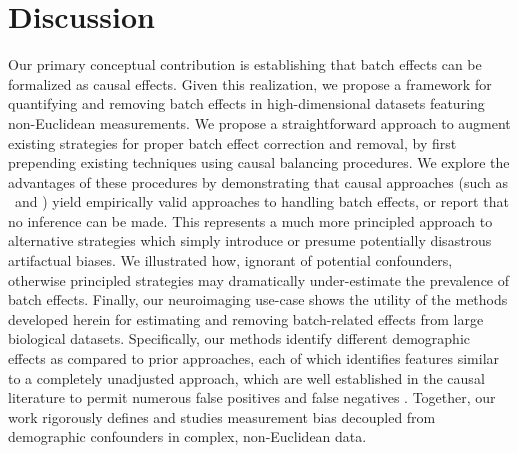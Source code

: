 \section{Discussion}
\label{sec:discussion}
Our primary conceptual contribution is establishing that batch effects can be formalized as causal effects.  Given this realization, we propose a framework for quantifying and removing batch effects in high-dimensional datasets featuring non-Euclidean measurements. We propose a straightforward approach to augment existing strategies for proper batch effect correction and removal, by first prepending existing techniques using causal balancing procedures. We explore the advantages of these procedures by demonstrating that causal approaches (such as \cccombat~and \ccdcorr) yield empirically valid approaches to handling batch effects, or report that no inference can be made. This represents a much more principled approach to alternative strategies which simply introduce or presume potentially disastrous artifactual biases. We illustrated how, ignorant of potential confounders, otherwise principled strategies may dramatically under-estimate the prevalence of batch effects. Finally, our neuroimaging use-case shows the utility of the methods developed herein for estimating and removing batch-related effects from large biological datasets. Specifically, our methods identify different demographic effects as compared to prior approaches, each of which identifies features similar to a completely unadjusted approach, which are well established in the causal literature to permit numerous false positives and false negatives \cite{Ding2015Mar,Forstmeier2017Nov}. 
Together, our work rigorously defines and studies measurement bias decoupled from demographic confounders in complex, non-Euclidean data.


